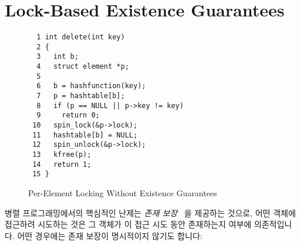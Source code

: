 
\section{Lock-Based Existence Guarantees}
\label{sec:locking:Lock-Based Existence Guarantees}

\begin{figure}[tbp]
{ \scriptsize
\begin{verbatim}
  1 int delete(int key)
  2 {
  3   int b;
  4   struct element *p;
  5
  6   b = hashfunction(key);
  7   p = hashtable[b];
  8   if (p == NULL || p->key != key)
  9     return 0;
 10   spin_lock(&p->lock);
 11   hashtable[b] = NULL;
 12   spin_unlock(&p->lock);
 13   kfree(p);
 14   return 1;
 15 }
\end{verbatim}
}
\caption{Per-Element Locking Without Existence Guarantees}
\label{fig:locking:Per-Element Locking Without Existence Guarantees}
\end{figure}

병렬 프로그래밍에서의 핵심적인 난제는 \emph{존재 보장}~\cite{Gamsa99} 을
제공하는 것으로, 어떤 객체에 접근하려 시도하는 것은 그 객체가 이 접근 시도 동안
존재하는지 여부에 의존적입니다.
어떤 경우에는 존재 보장이 명시적이지 않기도 합니다:
\iffalse

A key challenge in parallel programming is to provide
\emph{existence guarantees}~\cite{Gamsa99},
so that attempts to access a given object can rely on that object
being in existence throughout a given access attempt.
In some cases, existence guarantees are implicit:
\fi

